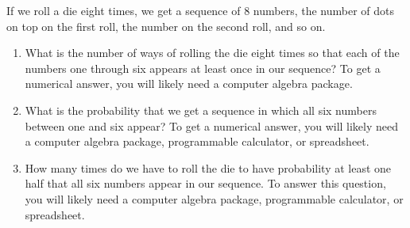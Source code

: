 \documentclass{book}
\begin{document}
\setcounter{cpjt}{232}
\addtocounter{cpjt}{-1}
\begin{activity}\label{activity-225}
\hypertarget{p-1231}{}%
If we roll a die eight times, we get a sequence of 8 numbers, the number of dots on top on the first roll, the number on the second roll, and so on.%
\begin{enumerate}[font=\bfseries,label=(\alph*),ref=\alph*]
\item\label{task-230} \hypertarget{p-1232}{}%
What is the number of ways of rolling the die eight times so that each of the numbers one through six appears at least once in our sequence? To get a numerical answer, you will likely need a computer algebra package.%
\par\smallskip%
\noindent\item\label{task-231} \hypertarget{p-1234}{}%
What is the probability that we get a sequence in which all six numbers between one and six appear? To get a numerical answer, you will likely need a computer algebra package, programmable calculator, or spreadsheet.%
\par\smallskip%
\noindent\item\label{task-232} \hypertarget{p-1236}{}%
How many times do we have to roll the die to have probability at least one half that all six numbers appear in our sequence. To answer this question, you will likely need a computer algebra package, programmable calculator, or spreadsheet.%
\par\smallskip%
\noindent\end{enumerate}
\end{activity}

\clearpage
\end{document}
